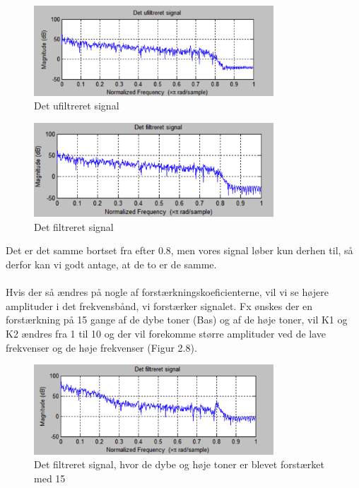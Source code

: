 \begin{figure}[H]
	\centering
	\includegraphics[width=0.8\textwidth]{Figur/Snip20151111_68}
	\caption{Det ufiltreret signal}
\end{figure}

\begin{figure}[H]
	\centering
	\includegraphics[width=0.8\textwidth]{Figur/Snip20151111_69}
	\caption{Det filtreret signal}
\end{figure}

Det er det samme bortset fra efter 0.8, men vores signal løber kun derhen til, så derfor kan vi godt antage, at de to er de samme. 
\\ \\
Hvis der så ændres på nogle af forstærkningskoeficienterne, vil vi se højere amplituder i det frekvensbånd, vi forstærker signalet. 
Fx ønskes der en forstærkning på 15 gange af de dybe toner (Bas) og af de høje toner, vil K1 og K2 ændres fra 1 til 10 og der vil forekomme større amplituder ved de lave frekvenser og de høje frekvenser (Figur 2.8). 

\begin{figure}[H]
	\centering
	\includegraphics[width=0.8\textwidth]{Figur/Snip20151111_70}
	\caption{Det filtreret signal, hvor de dybe og høje toner er blevet forstærket med 15}
\end{figure}

